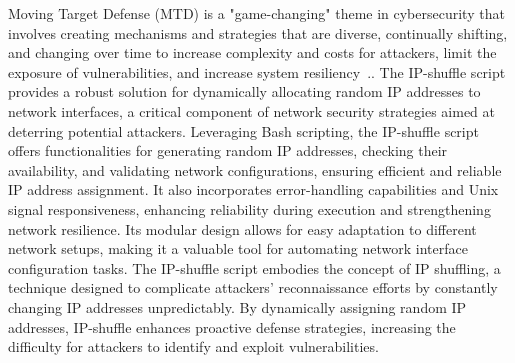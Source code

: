 Moving Target Defense (MTD) is a "game-changing" theme in cybersecurity that involves creating mechanisms and strategies that are diverse, continually shifting, and changing over time to increase complexity and costs for attackers, limit the exposure of vulnerabilities, and increase system resiliency~\cite{cai2016introduction}.. The IP-shuffle script provides a robust solution for dynamically allocating random IP addresses to network interfaces, a critical component of network security strategies aimed at deterring potential attackers.
Leveraging Bash scripting, the IP-shuffle script offers functionalities for generating random IP addresses, checking their availability, and validating network configurations, ensuring efficient and reliable IP address assignment. It also incorporates error-handling capabilities and Unix signal responsiveness, enhancing reliability during execution and strengthening network resilience. Its modular design allows for easy adaptation to different network setups, making it a valuable tool for automating network interface configuration tasks.
The IP-shuffle script embodies the concept of IP shuffling, a technique designed to complicate attackers' reconnaissance efforts by constantly changing IP addresses unpredictably. By dynamically assigning random IP addresses, IP-shuffle enhances proactive defense strategies, increasing the difficulty for attackers to identify and exploit vulnerabilities.
